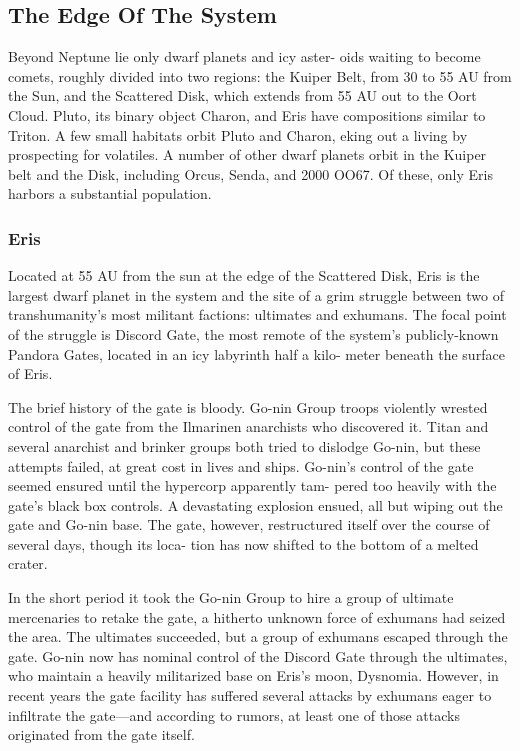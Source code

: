 \subsection{The Edge Of The System}

Beyond Neptune lie only dwarf planets and icy aster-
oids waiting to become comets, roughly divided into 
two regions: the Kuiper Belt, from 30 to 55 AU from 
the Sun, and the Scattered Disk, which extends from 
55 AU out to the Oort Cloud. Pluto, its binary object 
Charon, and Eris have compositions similar to Triton. 
A few small habitats orbit Pluto and Charon, eking 
out a living by prospecting for volatiles. A number of 
other dwarf planets orbit in the Kuiper belt and the 
Disk, including Orcus, Senda, and 2000 OO67. Of 
these, only Eris harbors a substantial population.

\subsubsection{Eris}

Located at 55 AU from the sun at the edge of the 
Scattered Disk, Eris is the largest dwarf planet in the 
system and the site of a grim struggle between two of 
transhumanity's most militant factions: ultimates and 
exhumans. The focal point of the struggle is Discord 
Gate, the most remote of the system's publicly-known 
Pandora Gates, located in an icy labyrinth half a kilo-
meter beneath the surface of Eris. 

The brief history of the gate is bloody. Go-nin 
Group troops violently wrested control of the gate 
from the Ilmarinen anarchists who discovered it. Titan 
and several anarchist and brinker groups both tried 
to dislodge Go-nin, but these attempts failed, at great 
cost in lives and ships. Go-nin's control of the gate 
seemed ensured until the hypercorp apparently tam-
pered too heavily with the gate's black box controls. 
A devastating explosion ensued, all but wiping out the 
gate and Go-nin base. The gate, however, restructured 
itself over the course of several days, though its loca-
tion has now shifted to the bottom of a melted crater.

In the short period it took the Go-nin Group to hire 
a group of ultimate mercenaries to retake the gate, a 
hitherto unknown force of exhumans had seized the 
area. The ultimates succeeded, but a group of exhumans 
escaped through the gate. Go-nin now has nominal 
control of the Discord Gate through the ultimates, who 
maintain a heavily militarized base on Eris's moon, 
Dysnomia. However, in recent years the gate facility has 
suffered several attacks by exhumans eager to infiltrate 
the gate—and according to rumors, at least one of those 
attacks originated from the gate itself.

